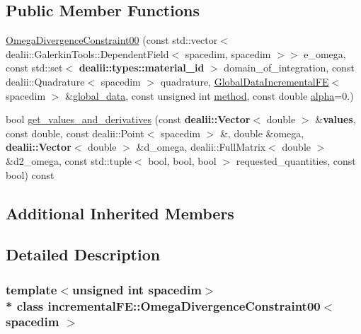 \subsection*{Public Member Functions}
\begin{DoxyCompactItemize}
\item 
\hyperlink{classincremental_f_e_1_1_omega_divergence_constraint00_a34e18a491023a4e842d2e44ecff7a455}{Omega\+Divergence\+Constraint00} (const std\+::vector$<$ dealii\+::\+Galerkin\+Tools\+::\+Dependent\+Field$<$ spacedim, spacedim $>$$>$ e\+\_\+omega, const std\+::set$<$ {\bf dealii\+::types\+::material\+\_\+id} $>$ domain\+\_\+of\+\_\+integration, const dealii\+::\+Quadrature$<$ spacedim $>$ quadrature, \hyperlink{classincremental_f_e_1_1_global_data_incremental_f_e}{Global\+Data\+Incremental\+FE}$<$ spacedim $>$ \&\hyperlink{classincremental_f_e_1_1_omega_3_01spacedim_00_01spacedim_01_4_afffe781a5a2032ec003032adc78e1bf3}{global\+\_\+data}, const unsigned int \hyperlink{classincremental_f_e_1_1_omega_3_01spacedim_00_01spacedim_01_4_a6c95d57122261e8a2e26d3818251bc9b}{method}, const double \hyperlink{classincremental_f_e_1_1_omega_3_01spacedim_00_01spacedim_01_4_ad881c36804cc027c301f4f069756c2db}{alpha}=0.)
\item 
bool \hyperlink{classincremental_f_e_1_1_omega_divergence_constraint00_a56323a14c158f9008621a9a5d77f1be8}{get\+\_\+values\+\_\+and\+\_\+derivatives} (const {\bf dealii\+::\+Vector}$<$ double $>$ \&{\bf values}, const double, const dealii\+::\+Point$<$ spacedim $>$ \&, double \&omega, {\bf dealii\+::\+Vector}$<$ double $>$ \&d\+\_\+omega, dealii\+::\+Full\+Matrix$<$ double $>$ \&d2\+\_\+omega, const std\+::tuple$<$ bool, bool, bool $>$ requested\+\_\+quantities, const bool) const 
\end{DoxyCompactItemize}
\subsection*{Additional Inherited Members}


\subsection{Detailed Description}
\subsubsection*{template$<$unsigned int spacedim$>$\\*
class incremental\+F\+E\+::\+Omega\+Divergence\+Constraint00$<$ spacedim $>$}

